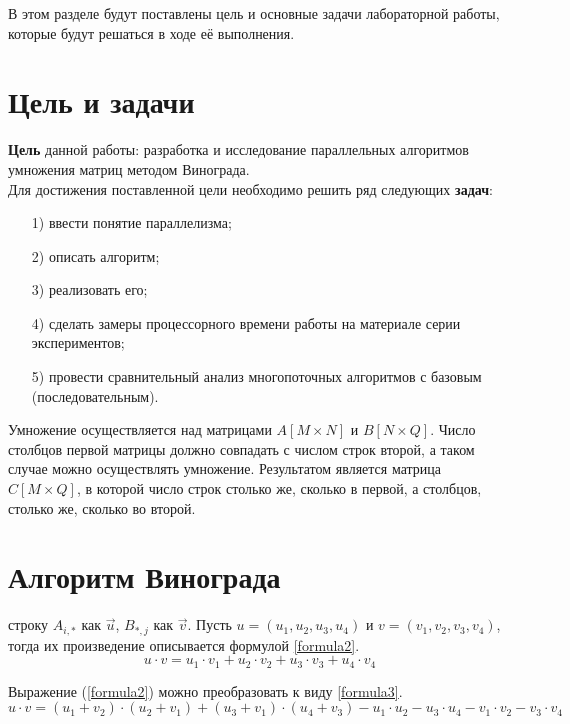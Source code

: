 В этом разделе будут поставлены цель и основные задачи лабораторной работы, которые будут решаться в ходе её выполнения.

\section{Цель и задачи}
\qquad\textbf{Цель} данной работы: разработка и исследование параллельных алгоритмов умножения матриц методом Винограда.\\

Для достижения поставленной цели необходимо решить ряд следующих \textbf{задач}:
\begin{enumerate}
	\item[1)] ввести понятие параллелизма;
	\item[2)] описать алгоритм;
	\item[3)] реализовать его;
	\item[4)] сделать замеры процессорного времени работы на материале серии экспериментов;
	\item[5)] провести сравнительный анализ многопоточных алгоритмов с базовым (последовательным).
\end{enumerate}

Умножение осуществляется над матрицами $A[M \times N]$ и $B[N \times Q]$. Число столбцов первой матрицы должно совпадать с числом строк второй, а таком случае можно осуществлять умножение. Результатом является матрица $C[M \times Q]$, в которой число строк столько же, сколько в первой, а столбцов, столько же, сколько во второй.

\section{Алгоритм Винограда}
 строку $A_{i,*}$ как $\overrightarrow{u}$, $B_{*,j}$ как $\overrightarrow{v}$.
Пусть $u = (u_1, u_2, u_3, u_4)$ и $v = (v_1, v_2, v_3, v_4)$, тогда их произведение описывается формулой \ref{formula2}.
\begin{equation}\label{formula2}
	u \cdot v = u_1 \cdot v_1 + u_2 \cdot v_2 + u_3 \cdot v_3 + u_4 \cdot v_4
\end{equation}

Выражение (\ref{formula2}) можно преобразовать к виду \ref{formula3}.
\begin{equation}\label{formula3}
	u \cdot v = (u_1 + v_2)\cdot(u_2 + v_1) + (u_3 + v_1)\cdot(u_4 + v_3) - u_1\cdot u_2 - u_3\cdot u_4 - v_1\cdot v_2 - v_3\cdot v_4
\end{equation}

